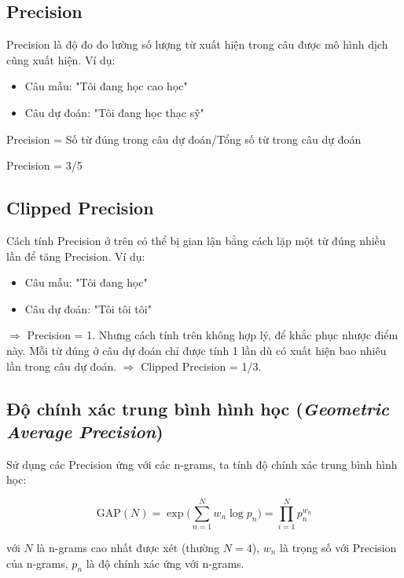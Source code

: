 \documentclass[14pt, a4paper]{article}
\numberwithin{equation}{section}
\numberwithin{algorithm}{section}
\numberwithin{figure}{section}
\numberwithin{dl}{section}
\numberwithin{md}{section}
\numberwithin{bd}{section}
\numberwithin{dn}{section}
\numberwithin{hq}{section}
\begin{document}
    \subsection{Precision}

    Precision là độ đo đo lường số lượng từ xuất hiện trong câu được mô hình dịch cũng xuất hiện. Ví dụ:

    \begin{itemize}
        \item Câu mẫu: "Tôi đang học cao học"
        \item Câu dự đoán: "Tôi đang học thạc sỹ"
    \end{itemize}

    Precision = Số từ đúng trong câu dự đoán/Tổng số từ trong câu dự đoán

    Precision = 3/5

    \subsection{Clipped Precision}

    Cách tính Precision ở trên có thể bị gian lận bằng cách lặp một từ đúng nhiều lần để tăng Precision. Ví dụ:

    \begin{itemize}
        \item Câu mẫu: "Tôi đang học"
        \item Câu dự đoán: "Tôi tôi tôi"
    \end{itemize}

    $\Rightarrow$ Precision = 1. Nhưng cách tính trên không hợp lý, để khắc phục nhược điểm này. Mỗi từ đúng ở câu dự đoán chỉ được tính 1 lần dù có xuất hiện bao nhiêu lần trong câu dự đoán.
    $\Rightarrow$ Clipped Precision = 1/3.

    \subsection{Độ chính xác trung bình hình học (\textit{Geometric Average Precision})}

    Sử dụng các Precision ứng với các n-grams, ta tính độ chính xác trung bình hình học:

    \begin{equation}
        \mathrm{GAP}(N)=\exp\big( \sum_{n=1}^N w_n \log p_n \big)=\prod_{i=1}^N p_n^{w_n}
    \end{equation}

    với $N$ là n-grams cao nhất được xét (thường $N=4$), $w_n$ là trọng số với Precision của n-grams, $p_n$ là độ chính xác ứng với n-grams.
\end{document}
